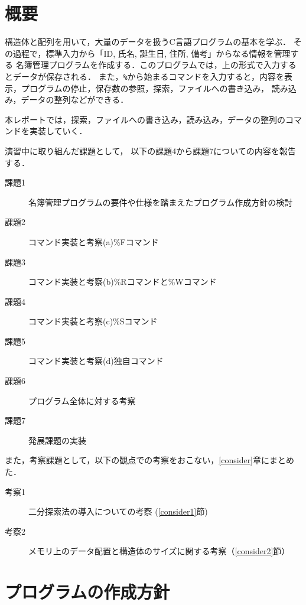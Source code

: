 \section{概要} \label{sec:abstract}
構造体と配列を用いて，大量のデータを扱うC言語プログラムの基本を学ぶ．
その過程で，標準入力から「ID, 氏名, 誕生日, 住所, 備考」からなる情報を管理する
名簿管理プログラムを作成する．このプログラムでは，上の形式で入力するとデータが保存される．
また，\verb|%|から始まるコマンドを入力すると，内容を表示，プログラムの停止，保存数の参照，探索，ファイルへの書き込み，
読み込み，データの整列などができる．

本レポートでは，探索，ファイルへの書き込み，読み込み，データの整列のコマンドを実装していく．


演習中に取り組んだ課題として，
以下の課題4から課題7についての内容を報告する．

\begin{description}
  \item[課題1]名簿管理プログラムの要件や仕様を踏まえたプログラム作成方針の検討
  \item[課題2]コマンド実装と考察(a)\%Fコマンド
  \item[課題3]コマンド実装と考察(b)\%Rコマンドと\%Wコマンド
  \item[課題4]コマンド実装と考察(c)\%Sコマンド
  \item[課題5]コマンド実装と考察(d)独自コマンド
  \item[課題6]プログラム全体に対する考察
  \item[課題7]発展課題の実装

\end{description}

また，考察課題として，以下の観点での考察をおこない，\ref{consider}章にまとめた．

\begin{description}
  \item[考察1]二分探索法の導入についての考察 (\ref{consider1}節)
  \item[考察2] メモリ上のデータ配置と構造体のサイズに関する考察（\ref{consider2}節）
\end{description}
\clearpage

\section{プログラムの作成方針} \label{sec:plan-of-programming}
    

